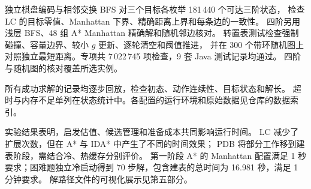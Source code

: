 \par\vspace{2bp}

独立棋盘编码与相邻交换 BFS 对三个目标各枚举 181\,440 个可达三阶状态，
检查 LC 的目标零值、Manhattan 下界、精确距离上界和每条边的一致性。
四阶另用浅层 BFS、48 组 A* Manhattan 精确解和随机邻边核对。
转置表测试检查强制碰撞、容量边界、较小 $g$ 更新、逐轮清空和阈值推进，
并在 300 个带环随机图上对照独立最短距离。专项共 7\,022\,745 项检查，9 套 Java 测试记录均通过。
四阶与随机图的核对覆盖所选实例。

所有成功求解的记录均逐步回放，检查初态、动作连续性、目标状态和解长。
超时与内存不足单列在状态统计中。各配置的运行环境和原始数据见仓库的数据索引。

实验结果表明，启发估值、候选管理和准备成本共同影响运行时间。
LC 减少了扩展次数，但在 A* 与 IDA* 中产生了不同的时间效果；
PDB 将部分工作移到建表阶段，需结合冷、热缓存分别评价。
第一阶段 A* 的 Manhattan 配置满足 1 秒要求；困难题独立冷启动得到 70 步解，包含建表的总时间为 16.981 秒，满足 1 分钟要求。
解路径文件的可视化展示见第五部分。
\FloatBarrier
\endgroup
\par\vspace{8bp}
